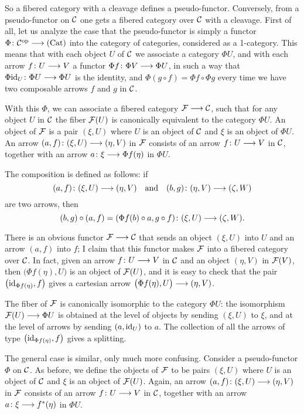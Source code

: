 \begin{3   FIBERED CATEGORIES}
\begin{3.1 Fibered categories}
So a fibered category with a cleavage defines a pseudo-functor. Conversely, from a pseudo-functor on $\mathcal{C}$ one gets a fibered category over $\mathcal{C}$ with a cleavage. First of all, let us analyze the case that the pseudo-functor is simply a functor $\Phi \colon \cC\op \arr \cat{Cat}$  into the category of categories, considered as a 1-category. This means that with each object $U$ of $\mathcal{C}$ we associate a category $\Phi U$, and with each arrow $f \colon U \arr V$ a functor $\Phi f \colon \Phi V \arr \Phi U$, in such a way that $\Phi\id_U \colon \Phi U \arr \Phi U$ is the identity, and $\Phi(g\circ f) = \Phi f \circ \Phi g$ every time we have two composable arrows $f$ and $g$ in $\mathcal{C}$.

With this $\Phi$, we can associate a fibered category $\cF \arr \cC$, such that for any object $U$ in $\mathcal{C}$ the fiber $\mathcal{F}(U)$ is canonically equivalent to the category $\Phi U$. An object of $\mathcal{F}$ is a pair $(\xi, U)$ where $U$ is an object of $\mathcal{C}$ and $\xi$ is an object of $\Phi U$. An arrow $(a, f) \colon (\xi, U) \arr (\eta, V)$ in $\mathcal{F}$ consists of an arrow $f \colon U \arr V$ in $\mathcal{C}$, together with an arrow $a \colon \xi \arr \Phi f(\eta)$ in $\Phi U$.

The composition is defined as follows: if
   \[
   (a, f) \colon (\xi, U) \arr (\eta, V)\quad
   \text{and}
   \quad (b, g) \colon (\eta, V) \arr (\zeta, W)
   \]
are two arrows, then 
   \[
   (b, g) \circ (a, f) = (\Phi f(b) \circ a, g \circ f) \colon 
   (\xi, U) \arr (\zeta, W).
   \]

There is an obvious functor $\cF \arr \cC$ that sends an object $(\xi, U)$ into $U$ and an arrow $(a, f)$ into $f$; I claim that this functor makes $\mathcal{F}$ into a fibered category over $\mathcal{C}$. In fact, given an arrow $f \colon U \arr V$ in $\mathcal{C}$ and an object $(\eta, V)$ in $\mathcal{F}(V)$, then $\bigl(\Phi f (\eta), U\bigr)$ is an object of $\mathcal{F}(U)$, and it is easy to check that the pair $\bigl(\mathrm{id}_{\Phi f (\eta)}, f\bigr)$ gives a cartesian arrow $\bigl(\Phi f (\eta), U\bigr) \arr (\eta, V)$.

The fiber of $\mathcal{F}$ is canonically isomorphic to the category $\Phi U$: the isomorphism $\cF(U) \arr \Phi U$ is obtained at the level of objects by sending $(\xi, U)$ to $\xi$, and at the level of arrows by sending $(a, \mathrm{id}_U)$ to $a$. The collection of all the arrows of type $\bigl(\mathrm{id}_{\Phi f (\eta)}, f\bigr)$ gives a splitting.


The general case is similar, only much more confusing. Consider a pseudo-functor $\Phi$ on $\mathcal{C}$. As before, we define the objects of $\mathcal{F}$ to be pairs $(\xi, U)$ where $U$ is an object of $\mathcal{C}$ and $\xi$ is an object of $\mathcal{F}(U)$. Again, an arrow $(a, f) \colon (\xi, U) \arr (\eta, V)$ in $\mathcal{F}$ consists of an arrow $f \colon U \arr V$ in $\mathcal{C}$, together with an arrow $a \colon \xi \arr f^*(\eta)$ in $\Phi U$.


\end{3.1 Fibered categories}
\end{3   FIBERED CATEGORIES}
